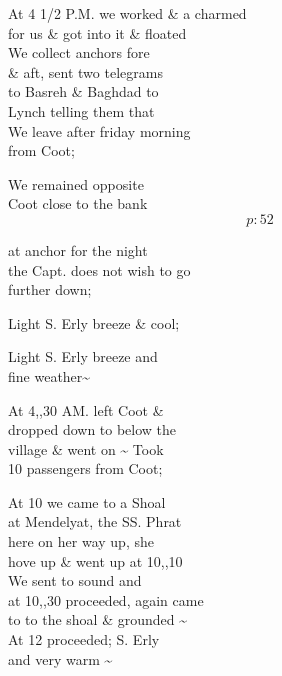 \documentclass{report}
\begin{document}
	\par{
 	At 4 1/2 P.M. we worked \& a charmed\ \\for us \& got into it \& floated\ \\We collect anchors fore\ \\\& aft, sent two telegrams\ \\to Basreh \& Baghdad to\ \\Lynch telling them that\ \\We leave after friday morning\ \\from Coot;\ \\
	}

	\par{
 	We remained opposite\ \\Coot close to the bank\ \\
  \[p: 52 \]

	}




	\par{
 	at anchor for the night\ \\the Capt. does not wish to go\ \\further down;\ \\
	}

	\par{
 	Light S. Erly breeze \& cool;\ \\
	}

	\par{
 	Light S. Erly breeze and\ \\fine weather\~{}\ \\
	}

	\par{
 	At 4,,30 AM. left Coot \&\ \\dropped down to below the\ \\village \& went on \~{} Took\ \\10 passengers from Coot;\ \\
	}

	\par{
 	At 10 we came to a Shoal\ \\at Mendelyat, the SS. Phrat\ \\here on her way up, she\ \\hove up \& went up at 10,,10\ \\We sent to sound and\ \\at 10,,30 proceeded, again came\ \\to to the shoal \& grounded \~{}\ \\At 12 proceeded; S. Erly\ \\and very warm \~{}\ \\
	}
\end{document}
